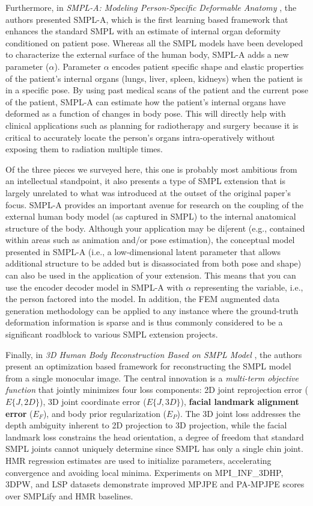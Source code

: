 \documentclass[final]{article}
\begin{document}
Furthermore, in \textit{SMPL-A: Modeling Person-Specific Deformable Anatomy} \cite{GuoPZKCW22}, the authors presented SMPL-A, which is the first learning based framework that enhances the standard SMPL with an estimate of internal organ deformity conditioned on patient pose. Whereas all the SMPL models have been developed to characterize the external surface of the human body, SMPL-A adds a new parameter ($\alpha$). Parameter $\alpha$ encodes patient specific shape and elastic properties of the patient's internal organs (lungs, liver, spleen, kidneys) when the patient is in a specific pose. By using past medical scans of the patient and the current pose of the patient, SMPL-A can estimate how the patient's internal organs have deformed as a function of changes in body pose. This will directly help with clinical applications such as planning for radiotherapy and surgery because it is critical to accurately locate the person's organs intra-operatively without exposing them to radiation multiple times.

Of the three pieces we surveyed here, this one is probably most ambitious from an intellectual standpoint, it also presents a type of SMPL extension that is largely unrelated to what was introduced at the outset of the original paper's focus. SMPL-A provides an important avenue for research on the coupling of the external human body model (as captured in SMPL) to the internal anatomical structure of the body. Although your application may be di[erent (e.g., contained within areas such as animation and/or pose estimation), the conceptual model presented in SMPL-A (i.e., a low-dimensional latent parameter that allows additional structure to be added but is disassociated from both pose and shape) can also be used in the application of your extension. This means that you can use the encoder decoder model in SMPL-A with $\alpha$ representing the variable, i.e., the person factored into the model. In addition, the FEM augmented data generation methodology can be applied to any instance where the ground-truth deformation information is sparse and is thus commonly considered to be a significant roadblock to various SMPL extension projects.

Finally, in \textit{3D Human Body Reconstruction Based on SMPL Model} \cite{ChenSLMZJ22}, the authors present an optimization based framework for reconstructing the SMPL model from a single monocular image. The central innovation is a \textit{multi-term objective function} that jointly minimizes four loss components: 2D joint reprojection error ($E\{J, 2D\}$), 3D joint coordinate error ($E\{J, 3D\}$), \textbf{facial landmark alignment error} ($E_F$), and body prior regularization ($E_P$). The 3D joint loss addresses the depth ambiguity inherent to 2D projection to 3D projection, while the facial landmark loss constrains the head orientation, a degree of freedom that standard SMPL joints cannot uniquely determine since SMPL has only a single chin joint. HMR regression estimates are used to initialize parameters, accelerating convergence and avoiding local minima. Experiments on MPI\_INF\_3DHP, 3DPW, and LSP datasets demonstrate improved MPJPE and PA-MPJPE scores over SMPLify and HMR baselines.
\end{document}
